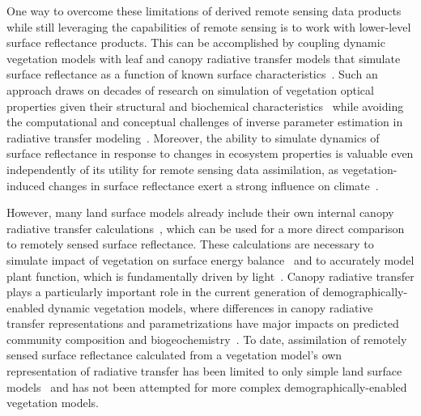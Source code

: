 One way to overcome these limitations of derived remote sensing data products while still leveraging the capabilities of remote sensing is to work with lower-level surface reflectance products.
This can be accomplished by coupling dynamic vegetation models with leaf and canopy radiative transfer models that simulate surface reflectance as a function of known surface characteristics~\citep{knorr2001assimilation, nouvellon2001coupling, quaife2008assimilating}.
Such an approach draws on decades of research on simulation of vegetation optical properties given their structural and biochemical characteristics~\citep{dickinson_1983_land, sellers1985canopy, verhoef1984light, lewis2007spectral, jacquemoud2009prospect, pinty2004synergy, widlowski2007third, widlowski2015fourth, hogan_2018_fast} while avoiding the computational and conceptual challenges of inverse parameter estimation in radiative transfer modeling~\citep{combal2003retrieval, lewis2007spectral}.
Moreover, the ability to simulate dynamics of surface reflectance in response to changes in ecosystem properties is valuable even independently of its utility for remote sensing data assimilation, as vegetation-induced changes in surface reflectance exert a strong influence on climate~\citep{bonan2008forests, swann2010changes, swann2012midlatitude}.

However, many land surface models already include their own internal canopy radiative transfer calculations~\citep{dickinson1983land, sellers1985canopy}, which can be used for a more direct comparison to remotely sensed surface reflectance.
These calculations are necessary to simulate impact of vegetation on surface energy balance~\citep{bonan2008forests} and to accurately model plant function, which is fundamentally driven by light~\citep{hikosaka1995model, robakowski_2004_growth, niinemets2016withincanopy, keenan2016global}.
Canopy radiative transfer plays a particularly important role in the current generation of demographically-enabled dynamic vegetation models, where differences in canopy radiative transfer representations and parametrizations have major impacts on predicted community composition and biogeochemistry~\citep{loew_2014_do, fisher2018vegetation, viskari_2019_influence}.
To date, assimilation of remotely sensed surface reflectance calculated from a vegetation model's own representation of radiative transfer has been limited to only simple land surface models~\citep[e.g., SiPNET;][]{zobitz_2014_joint} and has not been attempted for more complex demographically-enabled vegetation models.

